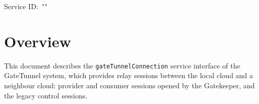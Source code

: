 \documentclass[a4paper]{arrowhead}
\begin{document}
\sloppy

\ArrowheadSetup

\begin{center}
  \vspace*{1cm}
  \huge{\arrowtitle}

  \vspace*{0.2cm}
  \LARGE{\arrowtype}
  \vspace*{1cm}

  \Large{Service ID: \textit{"\arrowid"}}

  \vspace*{\fill}


  \vspace*{1cm}
  \vspace*{\fill}

  \begin{abstract}
    This document describes the HTTP/1.1 protocol with TLS payload security and JSON payload encoding variant of the \texttt{gate\allowbreak{}Tunnel\allowbreak{}Connection} service of the GateTunnel system.
  \end{abstract}

  \vspace*{1cm}
\end{center}

\newpage

\tableofcontents
\newpage

\section{Overview}
\label{sec:overview}

This document describes the \texttt{gate\allowbreak{}Tunnel\allowbreak{}Connection} service interface of the GateTunnel system, which provides relay sessions between the local cloud and a neighbour cloud: provider and consumer sessions opened by the Gatekeeper, and the legacy control sessions.
\end{document}
